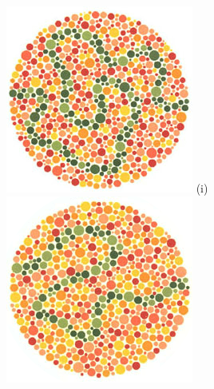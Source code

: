 \documentclass[	12pt, Times, openright, twoside, a4paper, english, brazil]{abntex2}
\begin{document}
\begin{apendicesenv}
\begin{figure}[!htb]
\centering
{\includegraphics[width=\linewidth]{ishihara-fuga/plate30.png}}
(i)
\endminipage\hfill
{}
\centering
{\includegraphics[width=\linewidth]{ishihara-fuga/plate31.png}}

\end{figure}
\end{apendicesenv}
\end{document}
